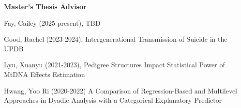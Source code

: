 {\large\textbf{Master's Thesis Advisor}}
\begin{etaremune}%
\item Fay, Cailey (2025-present), TBD
\item Good, Rachel  (2023-2024), Intergenerational Transmission of Suicide in the UPDB%
\item Lyu, Xuanyu  (2021-2023), Pedigree Structures Impact Statistical Power of MtDNA Effects Estimation%
\item Hwang, Yoo Ri (2020-2022) A Comparison of Regression-Based and Multilevel Approaches in Dyadic Analysis with a Categorical Explanatory Predictor%
\end{etaremune}%
